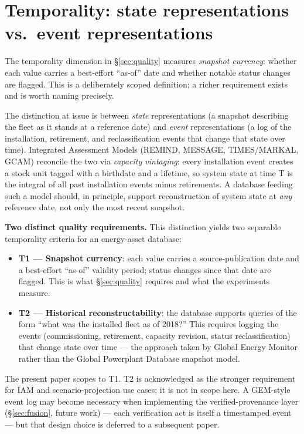 \documentclass[a4paper,11pt]{article}
\providecommand{\tightlist}{%
  \setlength{\itemsep}{0pt}\setlength{\parskip}{0pt}}
\begin{document}
\section{Temporality: state representations vs.~event
representations}\label{sec:annex-temporality}

The temporality dimension in §\ref{sec:quality} measures \emph{snapshot
currency}: whether each value carries a best-effort ``as-of'' date and
whether notable status changes are flagged. This is a deliberately
scoped definition; a richer requirement exists and is worth naming
precisely.

The distinction at issue is between \emph{state} representations (a
snapshot describing the fleet as it stands at a reference date) and
\emph{event} representations (a log of the installation, retirement, and
reclassification events that change that state over time). Integrated
Assessment Models (REMIND, MESSAGE, TIMES/MARKAL, GCAM) reconcile the
two via \emph{capacity vintaging}: every installation event creates a
stock unit tagged with a birthdate and a lifetime, so system state at
time T is the integral of all past installation events minus
retirements. A database feeding such a model should, in principle,
support reconstruction of system state at \emph{any} reference date, not
only the most recent snapshot.

\textbf{Two distinct quality requirements.} This distinction yields two
separable temporality criteria for an energy-asset database:

\begin{itemize}
\tightlist
\item
  \textbf{T1 --- Snapshot currency}: each value carries a
  source-publication date and a best-effort ``as-of'' validity period;
  status changes since that date are flagged. This is what
  §\ref{sec:quality} requires and what the experiments measure.
\item
  \textbf{T2 --- Historical reconstructability}: the database supports
  queries of the form ``what was the installed fleet as of 2018?'' This
  requires logging the events (commissioning, retirement, capacity
  revision, status reclassification) that change state over time --- the
  approach taken by Global Energy Monitor rather than the Global
  Powerplant Database snapshot model.
\end{itemize}

The present paper scopes to T1. T2 is acknowledged as the stronger
requirement for IAM and scenario-projection use cases; it is not in
scope here. A GEM-style event log may become necessary when implementing
the verified-provenance layer (§\ref{sec:fusion}, future work) --- each
verification act is itself a timestamped event --- but that design
choice is deferred to a subsequent paper.
\end{document}
